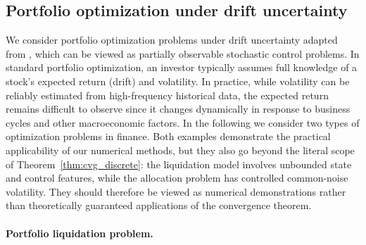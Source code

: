 \documentclass[11pt]{article}
\numberwithin{equation}{section}
\theoremstyle{plain}
\theoremstyle{definition}
\theoremstyle{remark}
\begin{document}
	
	\subsection{Portfolio optimization under drift uncertainty} \label{subsec:portfolio}
		We consider portfolio optimization problems under drift uncertainty adapted from \cite{balata2019class}, which can be viewed as partially observable stochastic control problems. In standard portfolio optimization, an investor typically assumes full knowledge of a stock's expected return (drift) and volatility. In practice, while volatility can be reliably estimated from high-frequency historical data, the expected return remains difficult to observe since it changes dynamically in response to business cycles and other macroeconomic factors. In the following we consider two types of optimization problems in finance. Both examples demonstrate the practical applicability of our numerical methods, but they also go beyond the literal scope of Theorem~\ref{thm:cvg_discrete}: the liquidation model involves unbounded state and control features, while the allocation problem has controlled common-noise volatility. They should therefore be viewed as numerical demonstrations rather than theoretically guaranteed applications of the convergence theorem.
	
	\paragraph{Portfolio liquidation problem.}
	
\end{document}
